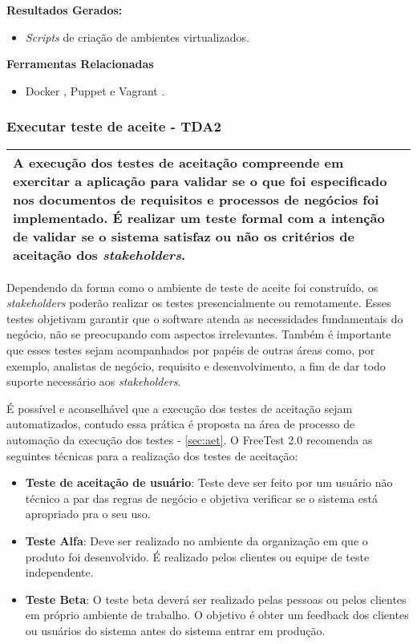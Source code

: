 \textbf{Resultados Gerados: }
\begin{itemize}
    \item  \textit{Scripts} de criação de ambientes virtualizados.
\end{itemize}

\textbf{Ferramentas Relacionadas }
\begin{itemize}
    \item Docker \cite{Docker}, Puppet \cite{Puppet} e Vagrant \cite{Vagrant}.
\end{itemize}

\subsubsection{Executar teste de aceite - TDA2}
\label{sec:tda2}

\begin{table}[!ht]
\centering
\begin{tabular}{|p{130mm}|}
\hline
A execução dos testes de aceitação compreende em exercitar a aplicação para validar se o que foi especificado nos documentos de requisitos e processos de negócios foi implementado. É realizar um teste formal com a intenção de validar se o sistema satisfaz ou não os critérios de aceitação dos \textit{stakeholders}. \\ 
\hline
\end{tabular}
\end{table}

Dependendo da forma como o ambiente de teste de aceite foi construído, os \textit{stakeholders} poderão realizar os testes presencialmente ou remotamente. Esses testes objetivam garantir que o software atenda as necessidades fundamentais do negócio, não se preocupando com aspectos irrelevantes. Também é importante que esses testes sejam acompanhados por papéis de outras áreas como, por exemplo, analistas de negócio, requisito e desenvolvimento, a fim de dar todo suporte necessário aos \textit{stakeholders}.

É possível e aconselhável que a execução dos testes de aceitação sejam automatizados, contudo essa prática é proposta na área de processo de automação da execução dos testes - \ref{sec:aet}. O FreeTest 2.0 recomenda as seguintes técnicas para a realização dos testes de aceitação: 

\begin{itemize}
    \item \textbf{Teste de aceitação de usuário}: Teste deve ser feito por um usuário não técnico a par das regras de negócio e objetiva verificar se o sistema está apropriado pra o seu uso.
    \item \textbf{Teste Alfa}: Deve ser realizado no ambiente da organização em que o produto foi desenvolvido. É realizado pelos clientes ou equipe de teste independente.
    \item \textbf{Teste Beta}: O teste beta deverá ser realizado pelas pessoas ou pelos clientes em próprio ambiente de trabalho. O objetivo é obter um feedback dos clientes ou usuários do sistema antes do sistema entrar em produção.
\end{itemize}

